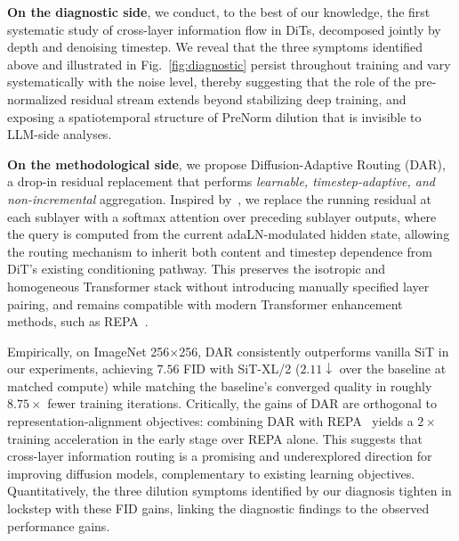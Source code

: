 \documentclass[]{ant_tech_report}
\begin{document}
\textbf{On the diagnostic side}, we conduct, to the best of our knowledge, the first systematic study of cross-layer information flow in DiTs, decomposed jointly by depth and denoising timestep. We reveal that the three symptoms identified above and illustrated in Fig.~\ref{fig:diagnostic} persist throughout training and vary systematically with the noise level, thereby suggesting that the role of the pre-normalized residual stream extends beyond stabilizing deep training, and exposing a spatiotemporal structure of PreNorm dilution that is invisible to LLM-side analyses.

\textbf{On the methodological side}, we propose Diffusion-Adaptive Routing (\textsc{DAR}), a drop-in residual replacement that performs \emph{learnable, timestep-adaptive, and non-incremental} aggregation. Inspired by~\citep{team2026attention}, we replace the running residual at each sublayer with a softmax attention over preceding sublayer outputs, where the query is computed from the current adaLN-modulated hidden state, allowing the routing mechanism to inherit both content and timestep dependence from DiT's existing conditioning pathway. This preserves the isotropic and homogeneous Transformer stack without introducing manually specified layer pairing, and remains compatible with modern Transformer enhancement methods, such as REPA~\citep{yu2025repa}.

Empirically, on ImageNet 256$\times$256, \textsc{DAR} consistently outperforms vanilla SiT in our experiments, achieving $7.56$ FID with SiT-XL/2 ($2.11\downarrow$ over the baseline at matched compute) while matching the baseline's converged quality in roughly $8.75 \times$ fewer training iterations. Critically, the gains of \textsc{DAR} are orthogonal to representation-alignment objectives: combining \textsc{DAR} with REPA~\citep{yu2025repa} yields a $2\times$ training acceleration in the early stage over REPA alone. This suggests that cross-layer information routing is a promising and underexplored direction for improving diffusion models, complementary to existing learning objectives. Quantitatively, the three dilution symptoms identified by our diagnosis tighten in lockstep with these FID gains, linking the diagnostic findings to the observed performance gains.
\end{document}
